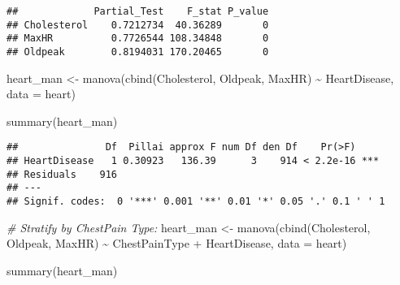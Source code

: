 \documentclass[
]{article}
\newenvironment{Shaded}{\begin{snugshade}}{\end{snugshade}}
\newcommand{\AttributeTok}[1]{\textcolor[rgb]{0.77,0.63,0.00}{#1}}
\newcommand{\CommentTok}[1]{\textcolor[rgb]{0.56,0.35,0.01}{\textit{#1}}}
\newcommand{\FunctionTok}[1]{\textcolor[rgb]{0.00,0.00,0.00}{#1}}
\newcommand{\NormalTok}[1]{#1}
\newcommand{\OtherTok}[1]{\textcolor[rgb]{0.56,0.35,0.01}{#1}}
\newcommand{\SpecialCharTok}[1]{\textcolor[rgb]{0.00,0.00,0.00}{#1}}
\begin{document}
\begin{Shaded}
\end{Shaded}

\begin{verbatim}
##             Partial_Test    F_stat P_value
## Cholesterol    0.7212734  40.36289       0
## MaxHR          0.7726544 108.34848       0
## Oldpeak        0.8194031 170.20465       0
\end{verbatim}

\begin{Shaded}
\begin{Highlighting}[]
\NormalTok{heart\_man }\OtherTok{\textless{}{-}} \FunctionTok{manova}\NormalTok{(}\FunctionTok{cbind}\NormalTok{(Cholesterol, Oldpeak, MaxHR) }\SpecialCharTok{\textasciitilde{}}\NormalTok{ HeartDisease,}
    \AttributeTok{data =}\NormalTok{ heart)}

\FunctionTok{summary}\NormalTok{(heart\_man)}
\end{Highlighting}
\end{Shaded}

\begin{verbatim}
##               Df  Pillai approx F num Df den Df    Pr(>F)    
## HeartDisease   1 0.30923   136.39      3    914 < 2.2e-16 ***
## Residuals    916                                             
## ---
## Signif. codes:  0 '***' 0.001 '**' 0.01 '*' 0.05 '.' 0.1 ' ' 1
\end{verbatim}

\begin{Shaded}
\begin{Highlighting}[]
\CommentTok{\# Stratify by ChestPain Type:}
\NormalTok{heart\_man }\OtherTok{\textless{}{-}} \FunctionTok{manova}\NormalTok{(}\FunctionTok{cbind}\NormalTok{(Cholesterol, Oldpeak, MaxHR) }\SpecialCharTok{\textasciitilde{}}\NormalTok{ ChestPainType }\SpecialCharTok{+}\NormalTok{ HeartDisease,}
    \AttributeTok{data =}\NormalTok{ heart)}

\FunctionTok{summary}\NormalTok{(heart\_man)}
\end{Highlighting}
\end{Shaded}
\end{document}
